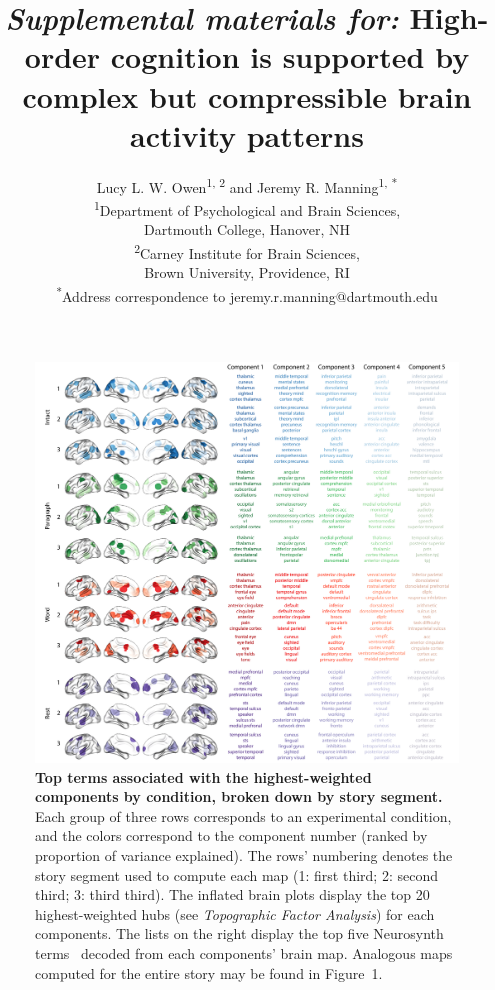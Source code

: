 \documentclass[english]{article}
\title{\textit{Supplemental materials for:} High-order cognition is supported by complex but compressible brain activity patterns}
\author{Lucy L. W. Owen\textsuperscript{1, 2} and Jeremy R. Manning\textsuperscript{1,
*}\\\textsuperscript{1}Department of Psychological and Brain Sciences,\\Dartmouth College,
Hanover, NH\\[0.1cm]\textsuperscript{2}Carney Institute for Brain Sciences,\\Brown University,
Providence, RI\\[0.1cm] \textsuperscript{*}Address correspondence to
jeremy.r.manning@dartmouth.edu}
\newcommand{\synth}{1}
\begin{document}
\maketitle


\begin{figure}
  \centering
  \includegraphics[width=\textwidth]{figs/pca_neurosynth_thirds}

\caption{\textbf{Top terms associated with the highest-weighted components by
condition, broken down by story segment.} Each group of three rows corresponds
to an experimental condition, and the colors correspond to the component number
(ranked by proportion of variance explained). The rows' numbering denotes the
story segment used to compute each map (1: first third; 2: second third; 3:
third third). The inflated brain plots display the top 20 highest-weighted hubs
(see \textit{Topographic Factor Analysis}) for each components. The lists on
the right display the top five Neurosynth terms~\citep{RubiEtal17} decoded from
each components' brain map. Analogous maps computed for the entire story may be
found in Figure~\synth.}

\label{fig:neurosynth-thirds}

\end{figure}

\newpage
\renewcommand{\refname}{Supplemental references}


\end{document}
